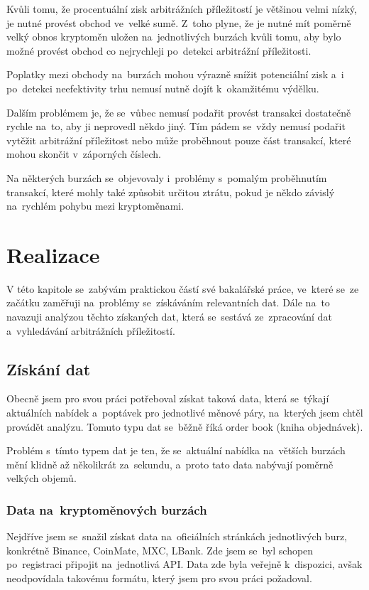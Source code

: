 \documentclass[thesis=B,czech]{FITthesis}[2019/03/21]
\begin{document}
Kvůli tomu, že procentuální zisk arbitrážních příležitostí je většinou velmi nízký, je nutné provést obchod ve~velké sumě. Z~toho plyne, že je nutné mít poměrně velký obnos kryptoměn uložen na~jednotlivých burzách kvůli tomu, aby bylo možné provést obchod co nejrychleji po~detekci arbitrážní příležitosti. 

Poplatky mezi obchody na~burzách mohou výrazně snížit potenciální zisk a~i po~detekci neefektivity trhu nemusí nutně dojít k~okamžitému výdělku.  

Dalším problémem je, že se~vůbec nemusí podařit provést transakci dostatečně rychle na~to, aby ji neprovedl někdo jiný. Tím pádem se~vždy nemusí podařit vytěžit arbitrážní příležitost nebo může proběhnout pouze část transakcí, které mohou skončit v~záporných číslech.

Na některých burzách se~objevovaly i~problémy s~pomalým proběhnutím transakcí, které mohly také způsobit určitou ztrátu, pokud je někdo závislý na~rychlém pohybu mezi kryptoměnami. \cite{finder}

\chapter{Realizace}
V této kapitole se~zabývám praktickou částí své bakalářské práce, ve~které se~ze začátku zaměřuji na~problémy se~získáváním relevantních dat. Dále na~to navazuji analýzou těchto získaných dat, která se~sestává ze~zpracování dat a~vyhledávání arbitrážních příležitostí.

\section{Získání dat}
Obecně jsem pro svou práci potřeboval získat taková data, která se~týkají aktuálních nabídek a~poptávek pro jednotlivé měnové páry, na~kterých jsem chtěl provádět analýzu. Tomuto typu dat se~běžně říká order book (kniha objednávek).

Problém s~tímto typem dat je ten, že se~aktuální nabídka na~větších burzách mění klidně až několikrát za~sekundu, a~proto tato data nabývají poměrně velkých objemů.

\subsection{Data na~kryptoměnových burzách}
Nejdříve jsem se~snažil získat data na~oficiálních stránkách jednotlivých burz, konkrétně Binance, CoinMate, MXC, LBank. Zde jsem se~byl schopen po~registraci připojit na~jednotlivá API. Data zde byla veřejně k~dispozici, avšak neodpovídala takovému formátu, který jsem pro svou práci požadoval. 
\end{document}
